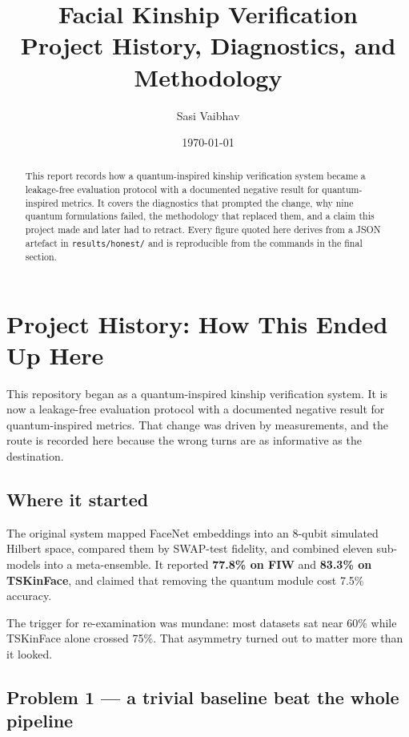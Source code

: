 \documentclass[11pt,a4paper]{article}
\title{\textbf{Facial Kinship Verification}\\[4pt]
\large Project History, Diagnostics, and Methodology}
\author{Sasi Vaibhav}
\date{\today}
\begin{document}
\maketitle

\begin{abstract}
\noindent
This report records how a quantum-inspired kinship verification system became a
leakage-free evaluation protocol with a documented negative result for
quantum-inspired metrics. It covers the diagnostics that prompted the change,
why nine quantum formulations failed, the methodology that replaced them, and a
claim this project made and later had to retract. Every figure quoted here
derives from a JSON artefact in \texttt{results/honest/} and is reproducible
from the commands in the final section.
\end{abstract}

\tableofcontents
\vspace{12pt}

\section*{Project History: How This Ended Up Here}

This repository began as a quantum-inspired kinship verification system. It is
now a leakage-free evaluation protocol with a documented negative result for
quantum-inspired metrics. That change was driven by measurements, and the route
is recorded here because the wrong turns are as informative as the destination.

\subsection*{Where it started}

The original system mapped FaceNet embeddings into an 8-qubit simulated Hilbert
space, compared them by SWAP-test fidelity, and combined eleven sub-models into
a meta-ensemble. It reported \textbf{77.8\% on FIW} and \textbf{83.3\% on TSKinFace}, and
claimed that removing the quantum module cost 7.5\% accuracy.

The trigger for re-examination was mundane: most datasets sat near 60\% while
TSKinFace alone crossed 75\%. That asymmetry turned out to matter more than it
looked.

\subsection*{Problem 1 — a trivial baseline beat the whole pipeline}
\end{document}
